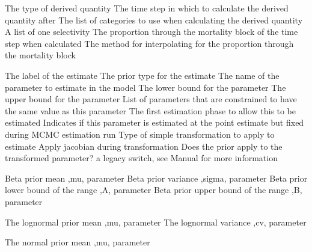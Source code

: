  {The type of derived quantity}
 {The time step in which to calculate the derived quantity after}
 {The list of categories to use when calculating the derived quantity}
 {A list of one selectivity}
 {The proportion through the mortality block of the time step when calculated}
 {The method for interpolating for the proportion through the mortality block}
 {}
\par\textbf{}\par
\par\textbf{}\par
{}\par\par
{} {The label of the estimate}
 {The prior type for the estimate}
 {The name of the parameter to estimate in the model}
 {The lower bound for the parameter}
 {The upper bound for the parameter}
 {List of parameters that are constrained to have the same value as this parameter}
 {The first estimation phase to allow this to be estimated}
 {Indicates if this parameter is estimated at the point estimate but fixed during MCMC estimation run}
 {Type of simple transformation to apply to estimate}
 {Apply jacobian during transformation}
 {Does the prior apply to the transformed parameter? a legacy switch, see Manual for more information}
\par\textbf{}\par
{} {Beta prior  mean ,mu, parameter}
 {Beta prior variance ,sigma, parameter}
 {Beta prior lower bound of the range ,A, parameter}
 {Beta prior upper bound of the range ,B, parameter}
\par\textbf{}\par
{} {The lognormal prior mean ,mu, parameter}
 {The lognormal variance ,cv, parameter}
\par\textbf{}\par
{} {The normal prior mean ,mu, parameter}

